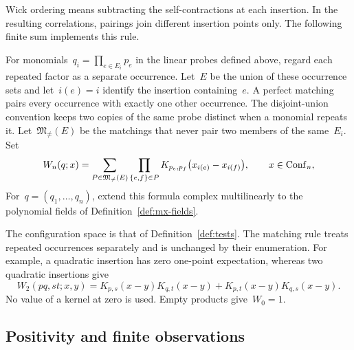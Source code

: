Wick ordering means subtracting the self-contractions at each insertion. In the resulting correlations, pairings join different insertion points only.
The following finite sum implements this rule.
\begin{definition}\label{def:mx-wick}
For monomials~$q_i=\prod_{e\in E_i}p_e$ in the linear probes defined above, regard each repeated factor as a separate occurrence. Let~$E$ be the union of these occurrence sets and let~$i(e)=i$ identify the insertion containing~$e$.
A perfect matching pairs every occurrence with exactly one other occurrence. The disjoint-union convention keeps two copies of the same probe distinct when a monomial repeats it.
Let~$\mathfrak M_{\ne}(E)$ be the matchings that never pair two members of the same~$E_i$.
Set
\begin{equation}\label{eq:mx-wick}
 W_n(q;x)=\sum_{P\in\mathfrak M_{\ne}(E)}
 \prod_{\{e,f\}\in P}K_{p_e,p_f}\bigl(x_{i(e)}-x_{i(f)}\bigr),
 \qquad x\in\operatorname{Conf}_{n},
\end{equation}
For~$q=(q_1,\ldots,q_n)$, extend this formula complex multilinearly to the polynomial fields of Definition~\ref{def:mx-fields}.
\end{definition}

The configuration space is that of Definition~\ref{def:tests}.
The matching rule treats repeated occurrences separately and is unchanged by their enumeration.
For example, a quadratic insertion has zero one-point expectation, whereas two quadratic insertions give
\begin{equation*}
 W_2(pq,st;x,y)
 =K_{p,s}(x-y)K_{q,t}(x-y)+K_{p,t}(x-y)K_{q,s}(x-y).
\end{equation*}
No value of a kernel at zero is used.
Empty products give~$W_0=1$.

\subsection{Positivity and finite observations}\label{subsec:mx-positive}

